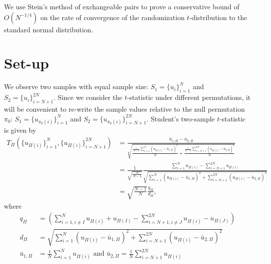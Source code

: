 We use Stein's method of exchangeable pairs to prove a conservative bound of $O(N^{-1/4})$ on the
rate of convergence of the randomization $t$-distribution to the standard normal distribution.

\section{Set-up}
We observe two samples with equal sample size: $S_1 = \{u_i\}_{i=1}^N$ and $S_2 =
\{u_i\}_{i=N+1}^{2N}$.  Since we consider the $t$-statistic under different permutations, it will be
convenient to re-write the sample values relative to the null permutation $\pi_0$: $S_1 =
\{u_{\pi_0(i)}\}_{i=1}^N$ and $S_2 = \{u_{\pi_0(i)}\}_{i=N+1}^{2N}$.
Student's two-sample $t$-statistic is given by
\begin{align*}
T_{\Pi}(\{u_{\Pi(i)}\}_{i=1}^N, \{u_{\Pi(i)}\}_{i=N+1}^{2N}) 
&= \frac{\bar{u}_{1,\Pi} - \bar{u}_{2,\Pi}}{\sqrt{\frac{\frac{1}{N-1}
      \sum_{i=1}^N(u_{\Pi(i)} - \bar{u}_{1,\Pi})^2}{N} + \frac{\frac{1}{N-1}
      \sum_{i=N+1}^{2N}(u_{\Pi(i)} - \bar{u}_{2,\Pi})^2}{N}}} \\
&= \frac{1}{\sqrt{\frac{N}{N-1}}} \frac{\sum_{i=1}^N u_{\Pi(i)} -
  \sum_{i=N+1}^{2N}u_{\Pi(i)}}{\sqrt{\sum_{i=1}^N(u_{\Pi(i)} - 
    \bar{u}_{1,\Pi})^2 + \sum_{i=N+1}^{2N}(u_{\Pi(i)} - \bar{u}_{2,\Pi})^2}} \\
&= \sqrt{\frac{N-1}{N}}\frac{q_\Pi}{d_\Pi},
\end{align*}
where
\begin{align*}
  q_\Pi &= \left (\sum_{i=1, i\neq I}^N u_{\Pi(i)} + u_{\Pi(I)} -
    \sum_{i=N+1, i\neq J}^{2N}u_{\Pi(i)} - u_{\Pi(J)}\right ) \\
  d_\Pi &= \sqrt{\sum_{i=1}^N(u_{\Pi(i)} - \bar{u}_{1,\Pi})^2 +
    \sum_{i=N+1}^{2N}(u_{\Pi(i)} - \bar{u}_{2,\Pi})^2} \\
  \bar{u}_{1,\Pi} &= \frac{1}{N} \sum_{i=1}^N u_{\Pi(i)} \text{ and } 
  \bar{u}_{2,\Pi} = \frac{1}{N} \sum_{i=N+1}^{2N} u_{\Pi(i)}
\end{align*}

